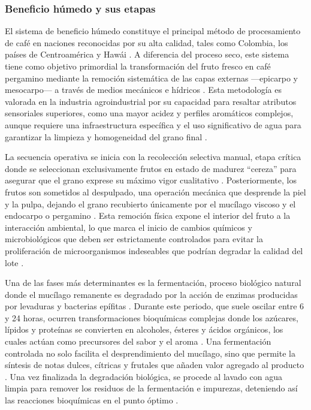 \subsubsection{Beneficio húmedo y sus etapas}

El sistema de beneficio húmedo constituye el principal método de procesamiento de café en naciones reconocidas por su alta calidad, tales como Colombia, los países de Centroamérica y Hawái \parencite{hasan_comparative_2024, osorio_hernandez_computational_2020}. A diferencia del proceso seco, este sistema tiene como objetivo primordial la transformación del fruto fresco en café pergamino mediante la remoción sistemática de las capas externas —epicarpo y mesocarpo— a través de medios mecánicos e hídricos \parencite{carmo_sensory_2020, polakova_changes_2022}. Esta metodología es valorada en la industria agroindustrial por su capacidad para resaltar atributos sensoriales superiores, como una mayor acidez y perfiles aromáticos complejos, aunque requiere una infraestructura específica y el uso significativo de agua para garantizar la limpieza y homogeneidad del grano final \parencite{hasan_comparative_2024, polakova_changes_2022}.

La secuencia operativa se inicia con la recolección selectiva manual, etapa crítica donde se seleccionan exclusivamente frutos en estado de madurez ``cereza'' para asegurar que el grano exprese su máximo vigor cualitativo \parencite{barbosa_sensory_2019, ferreira_bernardes_pereira_influence_2020}. Posteriormente, los frutos son sometidos al despulpado, una operación mecánica que desprende la piel y la pulpa, dejando el grano recubierto únicamente por el mucílago viscoso y el endocarpo o pergamino \parencite{polakova_changes_2022, barbosa_sensory_2019}. Esta remoción física expone el interior del fruto a la interacción ambiental, lo que marca el inicio de cambios químicos y microbiológicos que deben ser estrictamente controlados para evitar la proliferación de microorganismos indeseables que podrían degradar la calidad del lote \parencite{carmo_sensory_2020, carmo_quality_2020, de_bruyn_exploring_2017}.

Una de las fases más determinantes es la fermentación, proceso biológico natural donde el mucílago remanente es degradado por la acción de enzimas producidas por levaduras y bacterias epífitas \parencite{polakova_changes_2022, febrianto_coffee_2023, ferreira_impact_2024}. Durante este periodo, que suele oscilar entre 6 y 24 horas, ocurren transformaciones bioquímicas complejas donde los azúcares, lípidos y proteínas se convierten en alcoholes, ésteres y ácidos orgánicos, los cuales actúan como precursores del sabor y el aroma \parencite{polakova_changes_2022, ferreira_impact_2024, carmo_sensory_2020}. Una fermentación controlada no solo facilita el desprendimiento del mucílago, sino que permite la síntesis de notas dulces, cítricas y frutales que añaden valor agregado al producto \parencite{carmo_sensory_2020}. Una vez finalizada la degradación biológica, se procede al lavado con agua limpia para remover los residuos de la fermentación e impurezas, deteniendo así las reacciones bioquímicas en el punto óptimo \parencite{hasan_comparative_2024, barbosa_sensory_2019, dias_alixandre_physical_2023}.

